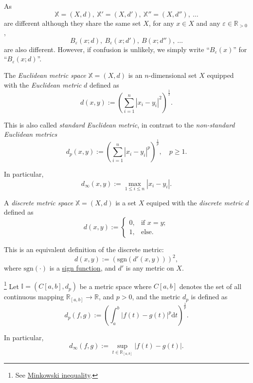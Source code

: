 \begin{note}
	As
	$$
	\mathbb X = (X, d), \ \mathbb X' = (X, d'), \ \mathbb X'' = (X, d''), \ \ldots
	$$
	are different although they share the same set $X$, for any $x \in X$ and any $\varepsilon \in \mathbb R_{> 0}$,
	$$
	B_\varepsilon(x; d),\ B_\varepsilon (x; d'), \ B(x; d''), \ \ldots
	$$
	are also different. However, if confusion is unlikely, we simply write ``$B_\varepsilon(x)$'' for ``$B_\varepsilon(x; d)$''.
\end{note}


\begin{example}
	The \textit{Euclidean metric space} $\mathbb X = (X, d)$ is an $n$-dimensional set $X$ equipped with the \textit{Euclidean metric} $d$ defined as
	$$
	d(x,y) := \left( \sum_{i = 1}^n |x_i - y_i|^2 \right)^\frac{1}{2}.
	$$
	
	This is also called \textit{standard Euclidean metric}, in contrast to the \textit{non-standard Euclidean metrics}
	$$
	d_p(x,y) := \left( \sum_{i = 1}^n |x_i - y_i|^p \right)^\frac{1}{p}, \quad p \ge 1.
	$$
	
	In particular,
	$$
	d_\infty (x,y) := \max_{1 \le i \le n} |x_i - y_i|.
	$$
\end{example}


\begin{example}
	A \textit{discrete metric space} $\mathbb X = (X, d)$ is a set $X$ equiped with the \textit{discrete metric} $d$ defined as
	$$
	d(x,y) :=
	\begin{cases}
		0, & \text{if $x = y$}; \\
		1, & \text{else}.
	\end{cases}
	$$
	
	This is an equivalent definition of the discrete metric:
	$$
	d(x, y) := (\mathrm{sgn}(d'(x,y)))^2,
	$$
	where $\mathrm{sgn}(\cdot)$ is a \href{https://en.wikipedia.org/wiki/Sign_function}{sign function}, and $d'$ is any metric on $X$.
\end{example}


\begin{example}
	\footnote{
		See \href{https://en.wikipedia.org/wiki/Minkowski_inequality}{Minkowski inequality}.
	}
	Let $\mathbb I = (C{[a,b]}, d_p)$ be a metric space where $C{[a,b]}$ denotes the set of all continuous mapping $\mathbb R_{[a,b]} \to \mathbb R$, and $p > 0$, and the metric $d_p$ is defined as
	$$
	d_p(f, g) := \left( \int_{a}^{b} |f(t) - g(t)|^p \mathrm{d} t \right)^\frac{1}{p}.
	$$
	
	In particular,
	$$
	d_\infty (f,g) := \sup_{t \in \mathbb R_{[a,b]}} |f(t) - g(t)|.
	$$
\end{example}


